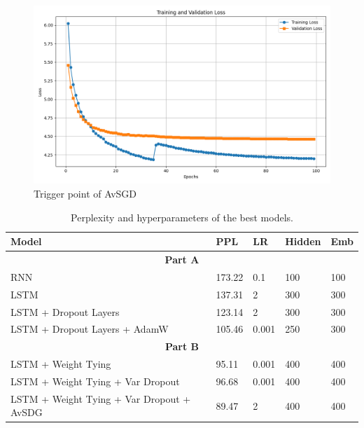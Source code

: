 \documentclass[a4paper]{article}
\begin{document}
\begin{figure}[h!]
\centering
\includegraphics[width=0.8\linewidth]{images/part_A_avsdg.png}
\caption{Trigger point of AvSGD}
\label{fig:plot-avsdg}
\end{figure}

\begin{table}[h!]
  \centering
  \begin{tabular}{l p{1 cm} p{1 cm} p{1 cm} p{1 cm}}
      \midrule
      \textbf{Model} & \textbf{PPL} & \textbf{LR} & \textbf{Hidden} & \textbf{Emb} \\
      \midrule
      \multicolumn{5}{c}{\textbf{Part A}} \\
      RNN                     & 173.22 & 0.1    & 100 & 100 \\
      LSTM                    & 137.31 & 2      & 300 & 300 \\
      LSTM + Dropout Layers      & 123.14 & 2      & 300 & 300 \\
      LSTM + Dropout Layers + AdamW & 105.46 & 0.001 & 250 & 300 \\
      \midrule
      \multicolumn{5}{c}{\textbf{Part B}} \\
      \midrule
      LSTM + Weight Tying & 95.11 & 0.001 & 400 & 400 \\
      LSTM + Weight Tying + Var Dropout & 96.68 & 0.001 & 400 & 400 \\
      LSTM + Weight Tying + Var Dropout + AvSDG & 89.47 & 2 & 400 & 400 \\
      \bottomrule
  \end{tabular}
  \caption{Perplexity and hyperparameters of the best models.}
  \label{tab:results}
\end{table}




\end{document}
